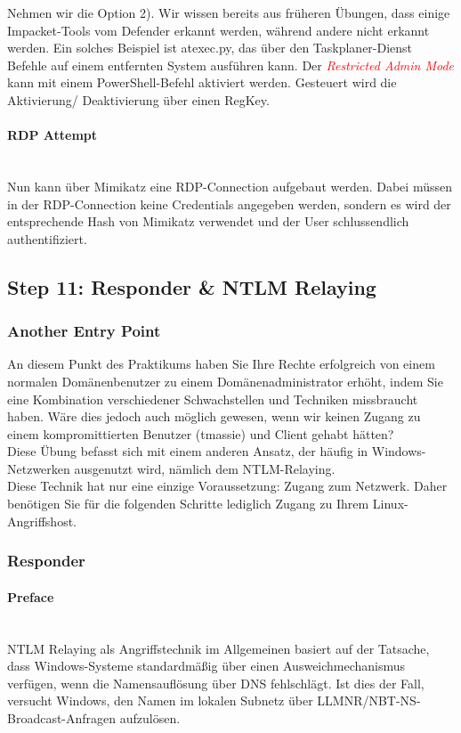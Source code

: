 Nehmen wir die Option 2). Wir wissen bereits aus früheren Übungen, dass einige Impacket-Tools vom Defender erkannt werden, während andere nicht erkannt werden. Ein solches Beispiel ist atexec.py, das über den Taskplaner-Dienst Befehle auf einem entfernten System ausführen kann.
Der \textcolor{red}{\textit{Restricted Admin Mode}} kann mit einem PowerShell-Befehl aktiviert werden. Gesteuert wird die Aktivierung/ Deaktivierung über einen RegKey.

\paragraph{RDP Attempt}\mbox{} \\
Nun kann über Mimikatz eine RDP-Connection aufgebaut werden. Dabei müssen in der RDP-Connection keine Credentials angegeben werden, sondern es wird der entsprechende Hash von Mimikatz verwendet und der User schlussendlich authentifiziert.



\subsection{Step 11: Responder \& NTLM Relaying}

\subsubsection{Another Entry Point}
An diesem Punkt des Praktikums haben Sie Ihre Rechte erfolgreich von einem normalen Domänenbenutzer zu einem Domänenadministrator erhöht, indem Sie eine Kombination verschiedener Schwachstellen und Techniken missbraucht haben. Wäre dies jedoch auch möglich gewesen, wenn wir keinen Zugang zu einem kompromittierten Benutzer (tmassie) und Client gehabt hätten?\\

Diese Übung befasst sich mit einem anderen Ansatz, der häufig in Windows-Netzwerken ausgenutzt wird, nämlich dem NTLM-Relaying.\\

Diese Technik hat nur eine einzige Voraussetzung: Zugang zum Netzwerk. Daher benötigen Sie für die folgenden Schritte lediglich Zugang zu Ihrem Linux-Angriffshost.

\subsubsection{Responder}

\paragraph{Preface}\mbox{} \\
NTLM Relaying als Angriffstechnik im Allgemeinen basiert auf der Tatsache, dass Windows-Systeme standardmäßig über einen Ausweichmechanismus verfügen, wenn die Namensauflösung über DNS fehlschlägt. Ist dies der Fall, versucht Windows, den Namen im lokalen Subnetz über LLMNR/NBT-NS-Broadcast-Anfragen aufzulösen.\\

